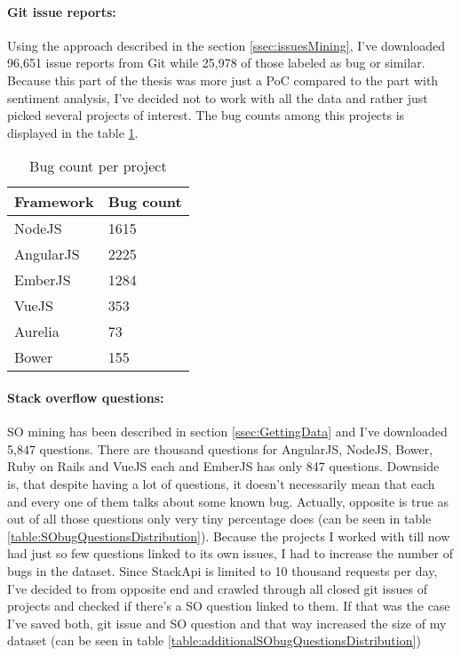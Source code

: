 \paragraph{Git issue reports:}
Using the approach described in the section \ref{ssec:issuesMining}, I've downloaded 96,651 issue reports from Git while 25,978 of those labeled as bug or similar. Because this part of the thesis was more just a PoC compared to the part with sentiment analysis, I've decided not to work with all the data and rather just picked several projects of interest. The bug counts among this projects is displayed in the table \ref{table:gitProjectIssuesDistribution}.


\begin{table}[H]
\centering
\begin{tabular}{ |p{3cm}||p{3cm}|}
 \hline
\textbf{ Framework }& \textbf{Bug count}\\
 \hline
 NodeJS   & 1615\\ \hline
 AngularJS &   2225 \\ \hline
 EmberJS & 1284\\ \hline
 VueJS & 353\\ \hline
 Aurelia & 73\\ \hline
 Bower & 155\\ \hline
\end{tabular}
\caption{Bug count per project}
\label{table:gitProjectIssuesDistribution}
\end{table}

\paragraph{Stack overflow questions:}
SO mining has been described in section \ref{ssec:GettingData} and I've downloaded 5,847 questions. There are thousand questions for AngularJS, NodeJS, Bower, Ruby on Rails and VueJS each and EmberJS has only 847 questions. Downside is, that despite having a lot of questions, it doesn't necessarily mean that each and every one of them talks about some known bug. Actually, opposite is true as out of all those questions only very tiny percentage does (can be seen in table \ref{table:SObugQuestionsDistribution}). Because the projects I worked with till now had just so few questions linked to its own issues, I had to increase the number of bugs in the dataset. Since StackApi is limited to 10 thousand requests per day, I've decided to from opposite end and crawled through all closed git issues of projects and checked if there's a SO question linked to them. If that was the case I've saved both, git issue and SO question and that way increased the size of my dataset (can be seen in table \ref{table:additionalSObugQuestionsDistribution})

